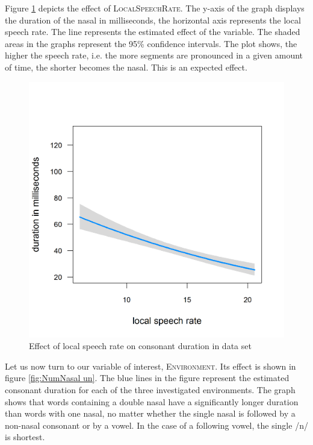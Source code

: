 Figure \ref{fig:SpeechRate un} depicts the effect of \textsc{LocalSpeechRate}.  The y-axis of the graph displays the duration of the nasal in milliseconds, the horizontal axis represents the local speech rate. The line represents the estimated effect of the variable. The shaded areas in the graphs represent the 95\% confidence intervals. The  plot shows, the higher the speech rate, i.e. the more segments are pronounced in a given amount of time, the shorter becomes the nasal. This is an expected effect.





\begin{figure} [t!]
	\centering

	\includegraphics [scale=0.4]{images/Corpus/unModelSpeechRate.png}
	\caption{ Effect of local speech rate on consonant duration in data set}
	\label{fig:SpeechRate un}

\end{figure}





Let us now turn to our variable of interest, \textsc{Environment}. Its effect is shown in figure \ref{fig:NumNasal un}. The blue lines in the figure represent the estimated consonant duration for each of the three investigated environments. The graph shows that words containing a double nasal have a significantly longer duration than words with one nasal, no matter whether the single nasal is followed by a non-nasal consonant or by a vowel. In the case of a following vowel, the single /n/ is shortest. 




